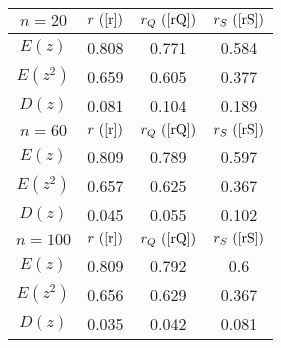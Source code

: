 \begin{tabular}{|c|c|c|c|}
\hline
$n = 20$ & $r ~(\ref{r})$ & $r_Q ~(\ref{rQ})$ & $r_S ~(\ref{rS})$\\
\hline
$E(z)$ & 0.808 & 0.771 & 0.584\\
\hline
$E(z^2)$ & 0.659 & 0.605 & 0.377\\
\hline
$D(z)$ & 0.081 & 0.104 & 0.189\\
\hline
$n = 60$ & $r ~(\ref{r})$ & $r_Q ~(\ref{rQ})$ & $r_S ~(\ref{rS})$\\
\hline
$E(z)$ & 0.809 & 0.789 & 0.597\\
\hline
$E(z^2)$ & 0.657 & 0.625 & 0.367\\
\hline
$D(z)$ & 0.045 & 0.055 & 0.102\\
\hline
$n = 100$ & $r ~(\ref{r})$ & $r_Q ~(\ref{rQ})$ & $r_S ~(\ref{rS})$\\
\hline
$E(z)$ & 0.809 & 0.792 & 0.6\\
\hline
$E(z^2)$ & 0.656 & 0.629 & 0.367\\
\hline
$D(z)$ & 0.035 & 0.042 & 0.081\\
\hline
\end{tabular}